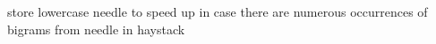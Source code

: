 
\begin{DoxyRefList}
\item[类 \mbox{\hyperlink{classdoris_1_1_volnitsky_base}{Volnitsky\+Base\texorpdfstring{$<$}{<} Case\+Sensitive, ASCII, Fallback\+Searcher \texorpdfstring{$>$}{>}}} ]\label{todo__todo000001}%
%
store lowercase needle to speed up in case there are numerous occurrences of bigrams from needle in haystack 
\end{DoxyRefList}